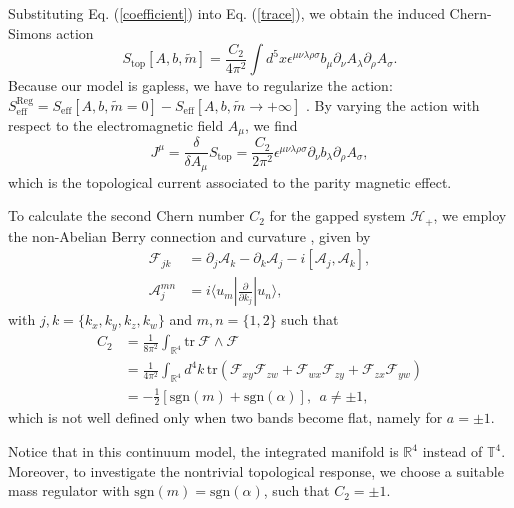 \documentclass[twocolumn,prl,10pt,superscriptaddress]{revtex4}
\begin{document}
\begin{appendix}
Substituting Eq. (\ref{coefficient}) into Eq. (\ref{trace}), we obtain the induced Chern-Simons action
\begin{equation}
S_{\text{top}}[A,b,\tilde{m}]=\frac{C_2}{4\pi^2}\int d^5x \epsilon^{\mu\nu\lambda\rho\sigma}b_{\mu}\partial_{\nu}A_{\lambda}\partial_{\rho}A_{\sigma}.
\end{equation}
Because our model is gapless,  we have to regularize the action:
 $S_{\text{eff}}^{\text{Reg}}=S_{\text{eff}}[A,b,\tilde{m}=0]-S_{\text{eff}}[A,b,\tilde{m}\rightarrow+\infty]$ \cite{Redlich1984}. By varying the action with respect to the electromagnetic field $A_\mu$, we find
\begin{equation}
J^{\mu}=\frac{\delta}{\delta A_{\mu}}S_{\text{top}} =\frac{C_2}{2\pi^2} \epsilon^{\mu\nu\lambda\rho\sigma}\partial_{\nu}b_{\lambda}\partial_{\rho}A_{\sigma},
\end{equation}
which is the topological current associated to the parity magnetic effect.

To calculate the second Chern number $C_2$ for the gapped system $\mathcal{H}_+$, we employ the non-Abelian Berry connection and curvature \cite{XLQi2008,Price2015}, given by
\begin{equation}
\begin{aligned}
\mathcal{F}_{jk}&=\partial_{j}\mathcal{A}_{k}-\partial_{k}\mathcal{A}_{j}-i[\mathcal{A}_{j},\mathcal{A}_{k}],\\ \mathcal{A}_{j}^{mn}&=i\langle u_{m}|\frac{\partial}{\partial k_{j}}|u_{n}\rangle,
\end{aligned}
\end{equation}
with $j,k=\{k_x,k_y,k_z,k_w\}$ and $m,n=\{1,2\}$  such that
\begin{equation}
\begin{aligned}
C_2&=\frac{1}{8\pi^2}\int_{\mathbb{R}^4}\text{tr}~\mathcal{F}\wedge \mathcal{F}\\
&=\frac{1}{4\pi^2}\int_{\mathbb{R}^4}d^4k\,\text{tr}\left(\mathcal{F}_{xy}\mathcal{F}_{zw}+\mathcal{F}_{wx}\mathcal{F}_{zy}+\mathcal{F}_{zx}\mathcal{F}_{yw}\right)\\
&=-\frac{1}{2}\left[\text{sgn}(m)+\text{sgn}(\alpha)\right], ~~ a\neq \pm1,
\end{aligned}
\end{equation}
which is not well defined only when two bands become flat, namely for $a= \pm1$.

Notice that in this continuum model, the integrated manifold is $\mathbb{R}^4$ instead of $\mathbb{T}^4$. Moreover, to investigate the nontrivial topological response, we choose a suitable mass regulator with $\text{sgn}(m)=\text{sgn}(\alpha)$, such that $C_2=\pm 1$.


\end{appendix}
\end{document}
